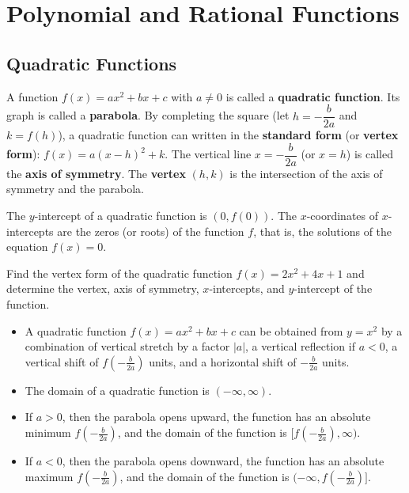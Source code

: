 
\chapter{Polynomial and Rational Functions}

\section{Quadratic Functions}
\begin{definition}
  A function $f(x)=ax^2+bx+c$ with $a\ne 0$ is called a \textbf{quadratic function}. Its graph is called a \textbf{parabola}. By completing the square (let $h=-\dfrac{b}{2a}$ and $k=f(h)$), a quadratic function can written in the \textbf{standard form} (or \textbf{vertex form}): $f(x)=a(x-h)^2+k$. The vertical line $x=-\dfrac{b}{2a}$ (or $x=h$) is called the \textbf{axis of symmetry}. The \textbf{vertex} $(h,k)$ is the intersection of the axis of symmetry and the parabola.
\end{definition}
\begin{note}
  The $y$-intercept of a quadratic function is $(0, f(0))$. The $x$-coordinates of $x$-intercepts are the zeros (or roots) of the function $f$, that is, the solutions of the equation $f(x)=0$.
\end{note}

\begin{example}
  Find the vertex form of the quadratic function $f(x)=2 x^{2} + 4 x + 1$ and determine the vertex, axis of symmetry, $x$-intercepts, and $y$-intercept of the function.
\end{example}

\begin{note}
  \begin{itemize}
    \item A quadratic function $f(x)=ax^2+bx+c$ can be obtained from $y=x^2$ by a combination of vertical stretch by a factor $|a|$, a vertical reflection if $a<0$, a vertical shift of $f\left(-\frac{b}{2a}\right)$ units, and a horizontal shift of $-\frac{b}{2a}$ units.
    \item The domain of a quadratic function is $(-\infty, \infty)$.
    \item If $a>0$, then the parabola opens upward, the function has an absolute minimum $f\left(-\frac{b}{2a}\right)$, and the domain of the function is $[f\left(-\frac{b}{2a}\right), \infty)$.
    \item If $a<0$, then the parabola opens downward, the function has an absolute maximum $f\left(-\frac{b}{2a}\right)$, and the domain of the function is $(-\infty,f\left(-\frac{b}{2a}\right)]$.
  \end{itemize}
\end{note}
\newpage

